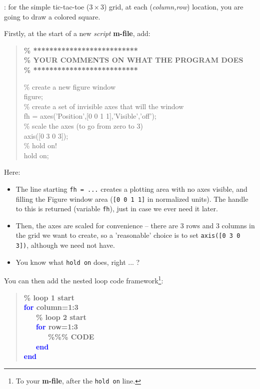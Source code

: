 \documentclass{tufte-book} %
\newenvironment{docspecbold}{\begin{quotation}\ttfamily\bfseries\parskip0pt\parindent0pt\ignorespaces}{\end{quotation}}
\begin{document}

: for the simple tic-tac-toe (\(3\times3\)) grid, at each (\textit{column,row}) location, you are going to draw a colored square.

Firstly, at the start of a new \textit{script} \textbf{m-file}, add:

\begin{docspecbold}
\textcolor[rgb]{0,0.501961,0}{\% **************************\\
\% YOUR COMMENTS ON WHAT THE PROGRAM DOES\\
\% **************************\\}

\textcolor[rgb]{0,0.501961,0}{\% create a new figure window\\}
figure;\\
\textcolor[rgb]{0,0.501961,0}{\% create a set of invisible axes that will the window\\}
fh = axes(\textcolor[rgb]{1,0,1}{'Position'},[0 0 1 1],\textcolor[rgb]{1,0,1}{'Visible'},\textcolor[rgb]{1,0,1}{'off'});\\
\textcolor[rgb]{0,0.501961,0}{\% scale the axes (to go from zero to 3)\\}
axis([0 3 0 3]);\\
\textcolor[rgb]{0,0.501961,0}{\% hold on!\\}
hold \textcolor[rgb]{1,0,1}{on};
\end{docspecbold}

\noindent Here:
\begin{itemize}[noitemsep]
\item The line starting \texttt{fh = ...} creates a plotting area with no axes visible, and filling the Figure window area (\texttt{[0 0 1 1]} in normalized units). The handle to this is returned (variable \texttt{fh}), just in case we ever need it later.
\item Then, the axes are scaled for convenience -- there are 3 rows and 3 columns in the grid we want to create, so a 'reasonable' choice is to set \texttt{axis([0 3 0 3])}, although we need not have.
\item You know what \texttt{hold on} does, right ... ?
\end{itemize}

You can then add the nested loop code framework\footnote{To your \textbf{m-file}, after the \texttt{hold on} line.}:
\begin{docspecbold}
\textcolor[rgb]{0,0.501961,0}{\% loop 1 start\\}
\textcolor{blue}{for} column=1:3\\
\ \ \ \textcolor[rgb]{0,0.501961,0}{\% loop 2 start\\}
\ \ \ \textcolor{blue}{for} row=1:3\\
\ \ \ \ \ \ \textcolor[rgb]{0,0.501961,0}{\%\%\% CODE}\\
\ \ \ \textcolor{blue}{end}\\
\textcolor{blue}{end}
\end{docspecbold}
\end{document}
